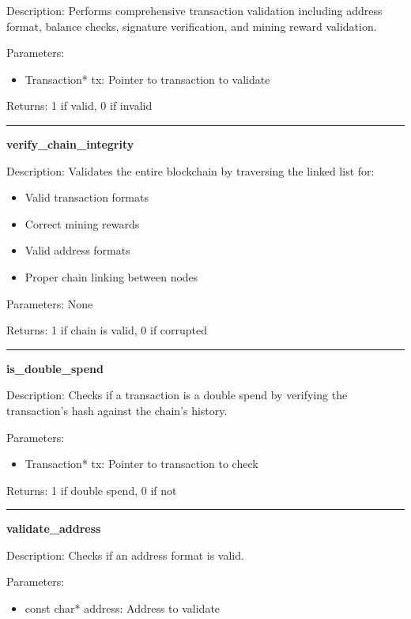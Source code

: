 \documentclass[12pt]{article}
\begin{document}
Description: Performs comprehensive transaction validation including address format, balance checks, signature verification, and mining reward validation.

Parameters:
\begin{itemize}
\item Transaction* tx: Pointer to transaction to validate
\end{itemize}

Returns: 1 if valid, 0 if invalid

\vspace{1em}
\hrule
\vspace{1em}

\textbf{verify\_chain\_integrity}

Description: Validates the entire blockchain by traversing the linked list for:
\begin{itemize}
\item Valid transaction formats
\item Correct mining rewards
\item Valid address formats
\item Proper chain linking between nodes
\end{itemize}

Parameters: None

Returns: 1 if chain is valid, 0 if corrupted

\vspace{1em}
\hrule
\vspace{1em}

\textbf{is\_double\_spend}

Description: Checks if a transaction is a double spend by verifying the transaction's hash against the chain's history.

Parameters:
\begin{itemize}
\item Transaction* tx: Pointer to transaction to check
\end{itemize}

Returns: 1 if double spend, 0 if not

\vspace{1em}
\hrule
\vspace{1em}

\textbf{validate\_address}

Description: Checks if an address format is valid.

Parameters:
\begin{itemize}
\item const char* address: Address to validate
\end{itemize}
\end{document}
